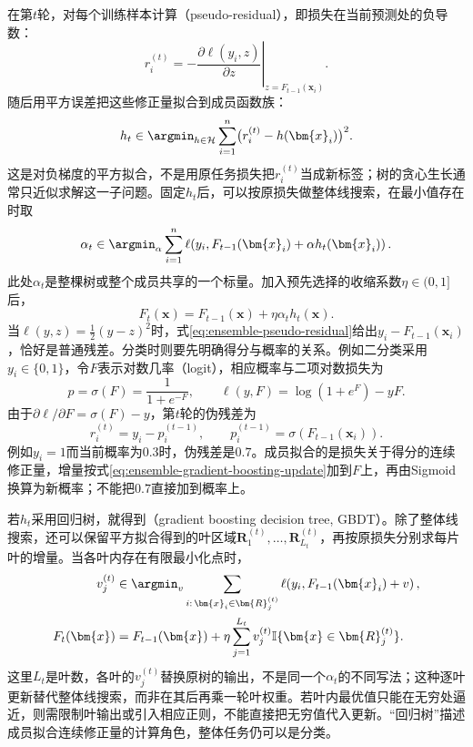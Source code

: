在第$t$轮，对每个训练样本计算（pseudo-residual），即损失在当前预测处的负导数：
\begin{equation}
  r_i^{(t)}
  =
  -
  \left.
  \frac{\partial \ell(y_i,z)}{\partial z}
  \right|_{z=F_{t-1}(\bm{x}_i)}.
  \label{eq:ensemble-pseudo-residual}
\end{equation}
随后用平方误差把这些修正量拟合到成员函数族：
\begin{equation}
  h_t\in\argmin_{h\in\mathcal{H}}
  \sum_{i=1}^{n}\bigl(r_i^{(t)}-h(\bm{x}_i)\bigr)^2.
  \label{eq:ensemble-gbm-gradient-fit}
\end{equation}
这是对负梯度的平方拟合，不是用原任务损失把$r_i^{(t)}$当成新标签；树的贪心生长通常只近似求解这一子问题。固定$h_t$后，可以按原损失做整体线搜索，在最小值存在时取
\begin{equation}
  \alpha_t\in\argmin_\alpha
  \sum_{i=1}^{n}
  \ell\!\left(y_i,F_{t-1}(\bm{x}_i)+\alpha h_t(\bm{x}_i)\right).
  \label{eq:ensemble-gbm-line-search}
\end{equation}
此处$\alpha_t$是整棵树或整个成员共享的一个标量。加入预先选择的收缩系数$\eta\in(0,1]$后，
\begin{equation}
  F_t(\bm{x})
  =
  F_{t-1}(\bm{x})
  +
  \eta\alpha_t h_t(\bm{x}).
  \label{eq:ensemble-gradient-boosting-update}
\end{equation}
当$\ell(y,z)=\tfrac12(y-z)^2$时，式\eqref{eq:ensemble-pseudo-residual}给出$y_i-F_{t-1}(\bm{x}_i)$，恰好是普通残差。分类时则要先明确得分与概率的关系。例如二分类采用$y_i\in\{0,1\}$，令$F$表示对数几率（logit），相应概率与二项对数损失为
\[
  p=\sigma(F)=\frac{1}{1+e^{-F}},\qquad
  \ell(y,F)=\log(1+e^F)-yF.
\]
由于$\partial\ell/\partial F=\sigma(F)-y$，第$t$轮的伪残差为
\[
  r_i^{(t)}=y_i-p_i^{(t-1)},\qquad
  p_i^{(t-1)}=\sigma\!\left(F_{t-1}(\bm{x}_i)\right).
\]
例如$y_i=1$而当前概率为$0.3$时，伪残差是$0.7$。成员拟合的是损失关于得分的连续修正量，增量按式\eqref{eq:ensemble-gradient-boosting-update}加到$F$上，再由Sigmoid换算为新概率；不能把$0.7$直接加到概率上。

若$h_t$采用回归树，就得到（gradient boosting decision tree, GBDT）。除了整体线搜索，还可以保留平方拟合得到的叶区域$\bm{R}_1^{(t)},\ldots,\bm{R}_{L_t}^{(t)}$，再按原损失分别求每片叶的增量。当各叶内存在有限最小化点时，
\begin{equation}
  \begin{aligned}
    v_j^{(t)}
      &\in\argmin_v
        \sum_{i:\,\bm{x}_i\in\bm{R}_j^{(t)}}
        \ell\!\left(y_i,F_{t-1}(\bm{x}_i)+v\right),\\
    F_t(\bm{x})
      &=F_{t-1}(\bm{x})
        +\eta\sum_{j=1}^{L_t}
        v_j^{(t)}\mathbb{I}\{\bm{x}\in\bm{R}_j^{(t)}\}.
  \end{aligned}
  \label{eq:ensemble-gbm-leaf-update}
\end{equation}
这里$L_t$是叶数，各叶的$v_j^{(t)}$替换原树的输出，不是同一个$\alpha_t$的不同写法；这种逐叶更新替代整体线搜索，而非在其后再乘一轮叶权重。若叶内最优值只能在无穷处逼近，则需限制叶输出或引入相应正则，不能直接把无穷值代入更新。“回归树”描述成员拟合连续修正量的计算角色，整体任务仍可以是分类。

